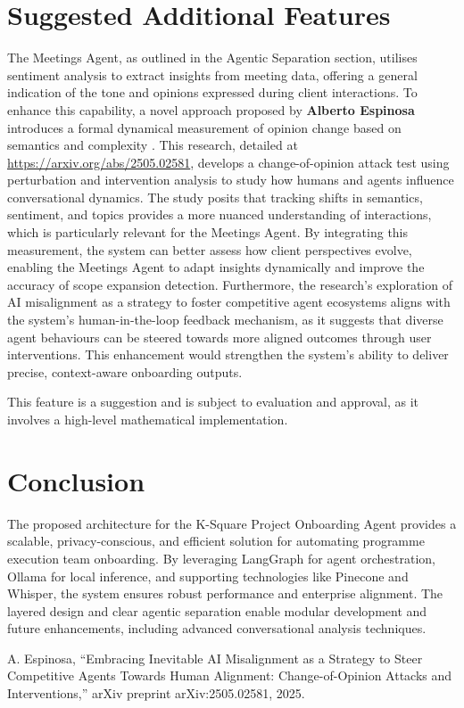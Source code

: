 \documentclass{article}
\begin{document}
\section{Suggested Additional Features}
The Meetings Agent, as outlined in the Agentic Separation section, utilises sentiment analysis to extract insights from meeting data, offering a general indication of the tone and opinions expressed during client interactions. To enhance this capability, a novel approach proposed by \textbf{Alberto Espinosa} introduces a formal dynamical measurement of opinion change based on semantics and complexity \cite{espinosa2025}. This research, detailed at \href{https://arxiv.org/abs/2505.02581}{https://arxiv.org/abs/2505.02581}, develops a change-of-opinion attack test using perturbation and intervention analysis to study how humans and agents influence conversational dynamics. The study posits that tracking shifts in semantics, sentiment, and topics provides a more nuanced understanding of interactions, which is particularly relevant for the Meetings Agent. By integrating this measurement, the system can better assess how client perspectives evolve, enabling the Meetings Agent to adapt insights dynamically and improve the accuracy of scope expansion detection. Furthermore, the research’s exploration of AI misalignment as a strategy to foster competitive agent ecosystems aligns with the system’s human-in-the-loop feedback mechanism, as it suggests that diverse agent behaviours can be steered towards more aligned outcomes through user interventions. This enhancement would strengthen the system’s ability to deliver precise, context-aware onboarding outputs. 

This feature is a suggestion and is subject to evaluation and approval, as it involves a high-level mathematical implementation.


\section{Conclusion}
The proposed architecture for the K-Square Project Onboarding Agent provides a scalable, privacy-conscious, and efficient solution for automating programme execution team onboarding. By leveraging LangGraph for agent orchestration, Ollama for local inference, and supporting technologies like Pinecone and Whisper, the system ensures robust performance and enterprise alignment. The layered design and clear agentic separation enable modular development and future enhancements, including advanced conversational analysis techniques.

\begin{thebibliography}{1}
A. Espinosa, ``Embracing Inevitable AI Misalignment as a Strategy to Steer Competitive Agents Towards Human Alignment: Change-of-Opinion Attacks and Interventions,'' arXiv preprint arXiv:2505.02581, 2025.
\end{thebibliography}
\end{document}
